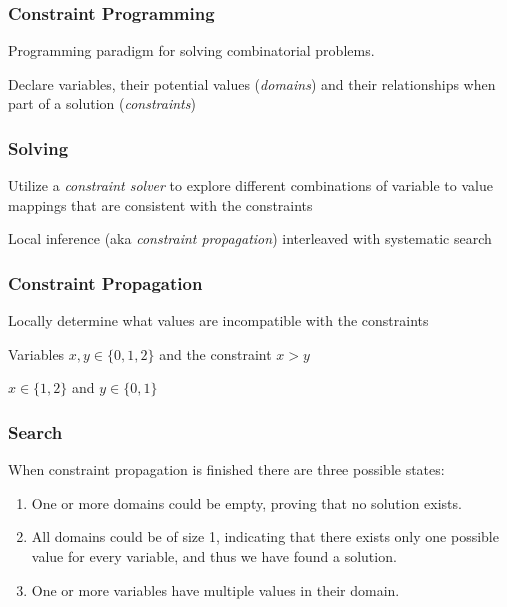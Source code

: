 \begin{frame}
	\frametitle{Constraint Programming}

	Programming paradigm for solving combinatorial problems.

	\vspace{0.5cm}

	Declare variables, their potential values (\textit{domains}) and their relationships when
	part of a solution (\textit{constraints})

\end{frame}

\begin{frame}
	\frametitle{Solving}

	Utilize a \textit{constraint solver} to explore different combinations of variable to
	value mappings that are consistent with the constraints

	\vspace{0.5cm}

	Local inference (aka \textit{constraint propagation}) interleaved with systematic search \cite{handbook-constraint-programming}

\end{frame}

\begin{frame}
	\frametitle{Constraint Propagation}
	Locally determine what values are incompatible with the constraints

	\vspace{0.5cm}

	Variables $x,y \in \{0,1,2\}$ and the constraint $x > y$

	\vspace{0.5cm}

	$x \in \{1,2\}$ and $y \in \{0,1\}$
\end{frame}

\begin{frame}
	\frametitle{Search}

	When constraint propagation is finished there are three possible states:

	\vspace{0.5cm}

	\begin{enumerate}
		\item One or more domains could be empty, proving that no solution exists.
		\item	All domains could be of size 1, indicating that there exists only one possible value for every variable, and thus we have found a solution.
		\item One or more variables have multiple values in their domain.
	\end{enumerate}

\end{frame}

